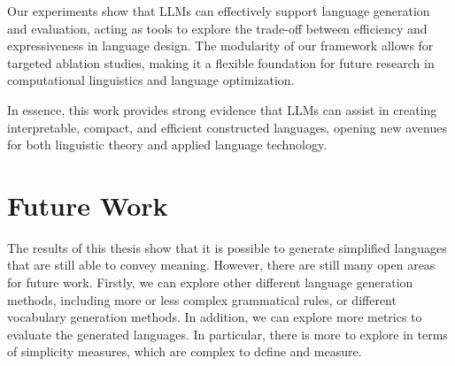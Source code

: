 Our experiments show that LLMs can effectively support language generation and evaluation, acting as tools to explore the trade-off between efficiency and expressiveness in language design. 
The modularity of our framework allows for targeted ablation studies, making it a flexible foundation for future research in computational linguistics and language optimization.

In essence, this work provides strong evidence that LLMs can assist in creating interpretable, compact, and efficient constructed languages, 
opening new avenues for both linguistic theory and applied language technology.


\section{Future Work}
The results of this thesis show that it is possible to generate simplified languages that are still able to convey meaning. However, there are still many
open areas for future work. Firstly, we can explore other different language generation methods, including more or less complex grammatical rules,
or different vocabulary generation methods. In addition, we can explore more metrics to evaluate the generated languages. In particular, there is more to explore
in terms of simplicity measures, which are complex to define and measure.
